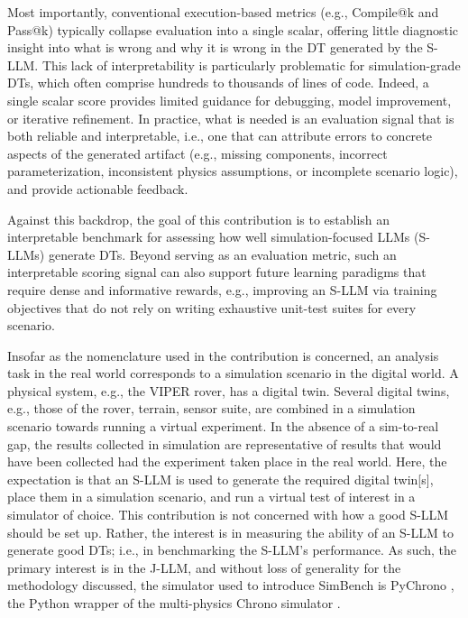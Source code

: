 Most importantly, conventional execution-based metrics (e.g., Compile@k and Pass@k)
typically collapse evaluation into a single scalar, 
offering little diagnostic insight into what is wrong and why it is wrong in the DT generated by the S-LLM.
This lack of interpretability is particularly problematic for simulation-grade DTs,
which often comprise hundreds to thousands of lines of code. Indeed, a single scalar score provides limited guidance for debugging, model improvement, or iterative refinement.
In practice, what is needed is an evaluation signal that is both reliable and interpretable, i.e., one that can
attribute errors to concrete aspects of the generated artifact (e.g., missing components,
incorrect parameterization, inconsistent physics assumptions, or incomplete scenario logic),
and provide actionable feedback.

Against this backdrop, the goal of this contribution is to establish an interpretable benchmark for assessing how well
simulation-focused LLMs (S-LLMs) generate DTs. Beyond serving as an evaluation metric,
such an interpretable scoring signal can also support future learning paradigms that require dense and
informative rewards, e.g., improving an S-LLM via training objectives that do not rely on writing
exhaustive unit-test suites for every scenario.
        
Insofar as the nomenclature used in the contribution is concerned, an analysis task in the real world corresponds to a simulation scenario in the digital world. A physical system, e.g., the VIPER rover, has a digital twin. Several digital twins, e.g., those of the rover, terrain, sensor suite, are combined in a simulation scenario towards running a virtual experiment.
 In the absence of a sim-to-real gap, the results collected in simulation are representative of results that
  would have been collected had the experiment taken place in the real world.
   Here, the expectation is that an S-LLM is used to generate the required digital twin[s],
    place them in a simulation scenario, and run a virtual test of interest in a simulator of choice.
     This contribution is not concerned with how a good S-LLM should be set up.
      Rather, the interest is in measuring the ability of an S-LLM to generate good DTs;
       i.e., in benchmarking the S-LLM's performance. As such, the primary interest is in the J-LLM, 
and without loss of generality for the methodology discussed, the simulator used to introduce SimBench is
 PyChrono \cite{pychrono2022}, the Python wrapper of the multi-physics Chrono simulator \cite{chronoOverview2016}. 

